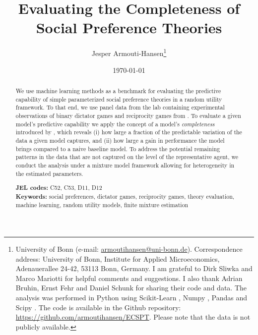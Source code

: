 \documentclass[11pt,a4paper]{article}
\theoremstyle{definition}
\begin{document}
\title{\vspace{-2cm}\large \textbf{Evaluating the Completeness of Social Preference Theories}}
\author{Jesper Armouti-Hansen\thanks{University of Bonn (e-mail: \href{mailto:armoutihansen@uni-bonn.de}{armoutihansen@uni-bonn.de}). Correspondence address: University of Bonn, Institute for Applied Microeconomics, Adenauerallee 24-42, 53113 Bonn, Germany. I am grateful to Dirk Sliwka and Marco Mariotti for helpful comments and suggestions. I also thank Adrian Bruhin, Ernst Fehr and Daniel Schunk for sharing their code and data. The analysis was performed in Python using Scikit-Learn \citep{Pedregosa2011}, Numpy \citep{Harris2020}, Pandas \citep{Mckinney2010} and Scipy \citep{Virtanen2020}. The code is available in the Github repository: \url{https://github.com/armoutihansen/ECSPT}. Please note that the data is not publicly available.}}
\date{\today}
\maketitle
\begin{abstract}
 We use machine learning methods as a benchmark for evaluating the predictive capability of simple parameterized social preference theories in a random utility framework. To that end, we use panel data from the lab containing experimental observations of binary dictator games and reciprocity games from \cite{Bruhin2019}. To evaluate a given model's predictive capability we apply the concept of a model's \emph{completeness} introduced by \cite{Fudenberg2021b}, which reveals (i) how large a fraction of the predictable variation of the data a given model captures, and (ii) how large a gain in performance the model brings compared to a naive baseline model. To address the potential remaining patterns in the data that are not captured on the level of the representative agent,  we conduct the analysis under a mixture model framework allowing for heterogeneity in the estimated parameters.

\textbf{JEL codes:} C52, C53, D11, D12\\
\textbf{Keywords:} social preferences, dictator games, reciprocity games, theory evaluation, machine learning, random utility models, finite mixture estimation
\end{abstract}
\end{document}
